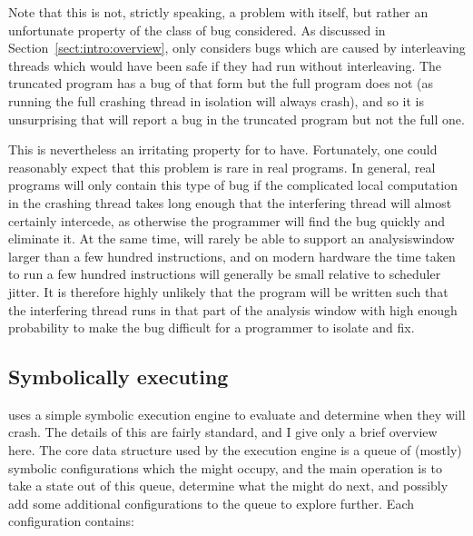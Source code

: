 Note that this is not, strictly speaking, a problem with {\technique}
itself, but rather an unfortunate property of the class of bug
considered.  As discussed in Section~\ref{sect:intro:overview},
{\technique} only considers bugs which are caused by interleaving
threads which would have been safe if they had run without
interleaving.  The truncated program has a bug of that form but the
full program does not (as running the full crashing thread in
isolation will always crash), and so it is unsurprising that
{\technique} will report a bug in the truncated program but not the
full one.

This is nevertheless an irritating property for {\technique} to have.
Fortunately, one could reasonably expect that this problem is rare in
real programs.  In general, real programs will only contain this type
of bug if the complicated local computation in the crashing thread
takes long enough that the interfering thread will almost certainly
intercede, as otherwise the programmer will find the bug quickly and
eliminate it.  At the same time, {\technique} will rarely be able to
support an \gls{analysiswindow} larger than a few hundred
instructions, and on modern hardware the time taken to run a few
hundred instructions will generally be small relative to scheduler
jitter.  It is therefore highly unlikely that the program will be
written such that the interfering thread runs in that part of the
analysis window with high enough probability to make the bug difficult
for a programmer to isolate and fix.  


\subsection{Symbolically executing {\StateMachines}}


{\Implementation} uses a simple symbolic execution engine to evaluate
{\StateMachines} and determine when they will crash.  The details of
this are fairly standard, and I give only a brief overview
here.  The core data structure
used by the execution engine is a queue of (mostly) symbolic
configurations which the {\StateMachine} might occupy, and the main
operation is to take a state out of this queue, determine what the
{\StateMachine} might do next, and possibly add some additional
configurations to the queue to explore further.  Each configuration
contains:

